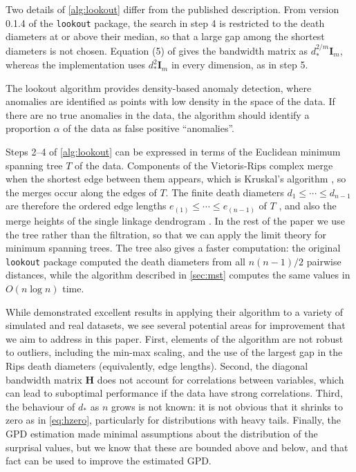 Two details of \cref{alg:lookout} differ from the published description. From version 0.1.4 of the \texttt{lookout} package, the search in step 4 is restricted to the death diameters at or above their median, so that a large gap among the shortest diameters is not chosen. Equation (5) of \citet{lookout} gives the bandwidth matrix as $d_*^{2/m}\bm{I}_m$, whereas the implementation uses $d_*^2\bm{I}_m$ in every dimension, as in step 5.

The lookout algorithm provides density-based anomaly detection, where anomalies are identified as points with low density in the space of the data. If there are no true anomalies in the data, the algorithm should identify a proportion $\alpha$ of the data as false positive ``anomalies''.

Steps 2--4 of \cref{alg:lookout} can be expressed in terms of the Euclidean minimum spanning tree $T$ of the data. Components of the Vietoris-Rips complex merge when the shortest edge between them appears, which is Kruskal's algorithm \citep{Kruskal1956}, so the merges occur along the edges of $T$. The finite death diameters $d_1 \le \cdots \le d_{n-1}$ are therefore the ordered edge lengths $e_{(1)} \le \cdots \le e_{(n-1)}$ of $T$ \citep[Remark 1]{AdamsPHdim}, and also the merge heights of the single linkage dendrogram \citep{Gower1969}. In the rest of the paper we use the tree rather than the filtration, so that we can apply the limit theory for minimum spanning trees. The tree also gives a faster computation: the original \texttt{lookout} package computed the death diameters from all $n(n-1)/2$ pairwise distances, while the algorithm described in \cref{sec:mst} computes the same values in $O(n\log n)$ time.

While \citet{lookout} demonstrated excellent results in applying their algorithm to a variety of simulated and real datasets, we see several potential areas for improvement that we aim to address in this paper. First, elements of the algorithm are not robust to outliers, including the min-max scaling, and the use of the largest gap in the Rips death diameters (equivalently, edge lengths). Second, the diagonal bandwidth matrix $\bm{H}$ does not account for correlations between variables, which can lead to suboptimal performance if the data have strong correlations. Third, the behaviour of $d_*$ as $n$ grows is not known: it is not obvious that it shrinks to zero as in \eqref{eq:hzero}, particularly for distributions with heavy tails. Finally, the GPD estimation made minimal assumptions about the distribution of the surprisal values, but we know that these are bounded above and below, and that fact can be used to improve the estimated GPD.

